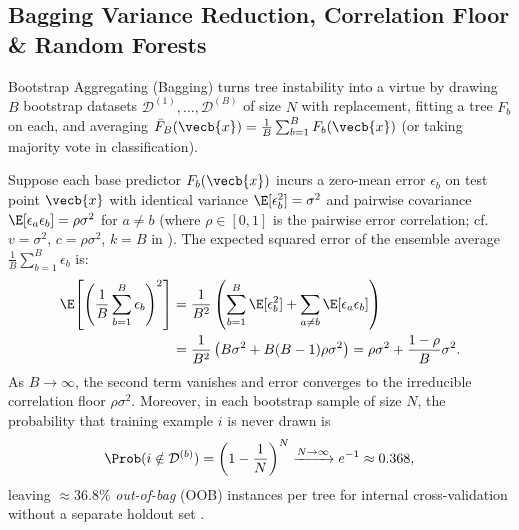 \documentclass[../../../../master.tex]{subfiles}
\begin{document}
\subsection{Bagging Variance Reduction, Correlation Floor \& Random Forests}

Bootstrap Aggregating (Bagging)  turns tree instability into a virtue by drawing $B$ bootstrap datasets $\mathcal{D}^{(1)}, \dots, \mathcal{D}^{(B)}$ of size $N$ with replacement, fitting a tree $F_b$ on each, and averaging $\bar{F}_B(\vecb{x}) = \frac{1}{B}\sum_{b=1}^{B} F_b(\vecb{x})$ (or taking majority vote in classification).

\begin{coremath}
Suppose each base predictor $F_b(\vecb{x})$ incurs a zero-mean error $\epsilon_b$ on test point $\vecb{x}$ with identical variance $\E[\epsilon_b^2] = \sigma^2$ and pairwise covariance $\E[\epsilon_a \epsilon_b] = \rho\sigma^2$ for $a \neq b$ (where $\rho \in [0, 1]$ is the pairwise error correlation; cf.\ $v = \sigma^2$, $c = \rho\sigma^2$, $k = B$ in ). The expected squared error of the ensemble average $\frac{1}{B}\sum_{b=1}^{B}\epsilon_b$ is:
\begin{align}
  \E\!\left[\left(\frac{1}{B}\sum_{b=1}^{B}\epsilon_b\right)^2\right]
  &= \frac{1}{B^2}\left(\sum_{b=1}^{B} \E[\epsilon_b^2] + \sum_{a \neq b} \E[\epsilon_a \epsilon_b]\right) \nonumber \\
  &= \frac{1}{B^2}\left(B\sigma^2 + B(B-1)\rho\sigma^2\right)
  = \rho\sigma^2 + \frac{1 - \rho}{B}\sigma^2.
  \label{eq:trees:bagging_var}
\end{align}
As $B \to \infty$, the second term vanishes and error converges to the irreducible correlation floor $\rho\sigma^2$. Moreover, in each bootstrap sample of size $N$, the probability that training example $i$ is never drawn is
\begin{equation}
  \Prob(i \notin \mathcal{D}^{(b)}) = \left(1 - \frac{1}{N}\right)^{N} \xrightarrow{N \to \infty} e^{-1} \approx 0.368,
  \label{eq:trees:oob}
\end{equation}
leaving $\approx 36.8\%$ \emph{out-of-bag} (OOB) instances per tree for internal cross-validation without a separate holdout set .
\end{coremath}
\end{document}

